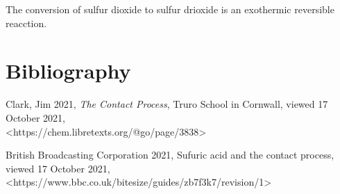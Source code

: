 \documentclass[12pt, a4paper]{article}
\begin{document}
The conversion of sulfur dioxide to sulfur drioxide is an exothermic reversible reacction.



\pagebreak

\section{Bibliography}
Clark, Jim 2021, \emph{The Contact Process}, Truro School in Cornwall, viewed 17 October 2021, \\ \textless{https://chem.libretexts.org/@go/page/3838}\textgreater

British Broadcasting Corporation 2021, Sufuric acid and the contact process, viewed 17 October 2021, \\ \textless{https://www.bbc.co.uk/bitesize/guides/zb7f3k7/revision/1}\textgreater
\end{document}
